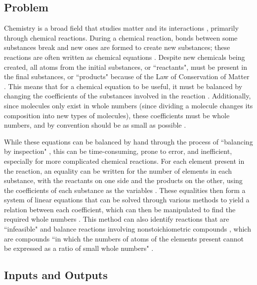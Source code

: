 \documentclass{article}
\begin{document}
\subsection{Problem} \label{prob}

Chemistry is a broad field that studies matter and its interactions
\cite{gordon_chm101_2023}, primarily through chemical reactions.
During a chemical reaction, bonds between some substances break and new ones are
formed to create new substances; these reactions are often written as chemical
equations \cite{lund_introduction_2023}. Despite new chemicals being created,
all atoms from the initial substances, or ``reactants", must be present in the
final substances, or ``products" because of the Law of Conservation of Matter
\cite{lund_introduction_2023}. This means that for a chemical equation to be
useful, it must be balanced by changing the coefficients of the substances
involved in the reaction \cite{lund_introduction_2023}. Additionally, since
molecules only exist in whole numbers (since dividing a molecule changes its
composition into new types of molecules), these coefficients must be whole
numbers, and by convention should be as small as possible
\cite{lund_introduction_2023}.

While these equations can be balanced by hand through the process of
``balancing by inspection" \cite{lund_introduction_2023}, this can be
time-consuming, prone
to error, and inefficient, especially for more complicated chemical reactions.
For each element present in the reaction, an equality can be written for the
number of elements in each substance, with the reactants on one side and the
products on the other, using the coefficients of each substance as the
variables \cite{hamid_balancing_2019}. These equalities then form a system of
linear
equations that can be solved through various methods to yield a relation
between each coefficient, which can then be manipulated to find the required
whole
numbers \cite{lund_introduction_2023, hamid_balancing_2019}. This method can
also identify reactions that are ``infeasible" and balance reactions involving
nonstoichiometric compounds \cite{hamid_balancing_2019}, which are compounds
``in which the numbers of atoms of the elements present cannot be expressed as
a ratio of small whole numbers"
\cite{the_editors_of_encyclopaedia_britannica_nonstoichiometric_2010}.

\subsection{Inputs and Outputs} \label{io}
\end{document}
